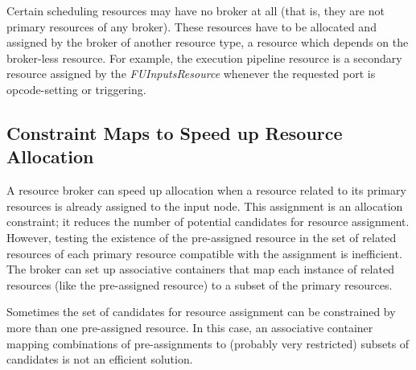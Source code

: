 \documentclass[a4paper,twoside]{tce}
\begin{document}
Certain scheduling resources may have no broker at all (that is, they are
not primary resources of any broker). These resources have to be allocated
and assigned by the broker of another resource type, a resource which
depends on the broker-less resource.
%
For example, the execution pipeline resource is a secondary resource
assigned by the \emph{FUInputsResource} whenever the requested port is
opcode-setting or triggering.

\subsection{Constraint Maps to Speed up Resource Allocation}
\label{ssec:broker-allocation}

A resource broker can speed up allocation when a resource related to its
primary resources is already assigned to the input node. This assignment is
an allocation constraint; it reduces the number of potential candidates for
resource assignment. However, testing the existence of the pre-assigned
resource in the set of related resources of each primary resource compatible
with the assignment is inefficient. The broker can set up associative
containers that map each instance of related resources (like the
pre-assigned resource) to a subset of the primary resources.

Sometimes the set of candidates for resource assignment can be constrained
by more than one pre-assigned resource. In this case, an associative
container mapping combinations of pre-assignments to (probably very
restricted) subsets of candidates is not an efficient solution.
\end{document}
